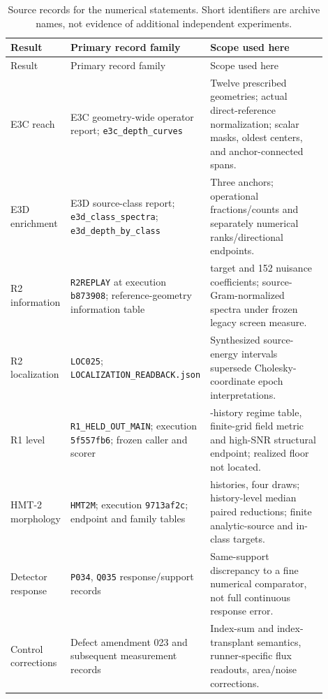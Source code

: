 \small
\begin{longtable}{>{\raggedright\arraybackslash}p{0.14\linewidth}>{\raggedright\arraybackslash}p{0.33\linewidth}>{\raggedright\arraybackslash}p{0.43\linewidth}}
\caption{Source records for the numerical statements. Short identifiers are archive names, not evidence of additional independent experiments.}\label{tab:records}\\
\toprule
Result&Primary record family&Scope used here\\
\midrule\endfirsthead
\toprule Result&Primary record family&Scope used here\\\midrule\endhead
E3C reach&E3C geometry-wide operator report; \texttt{e3c\_depth\_curves}&Twelve prescribed geometries; actual direct-reference normalization; scalar masks, oldest centers, and anchor-connected spans.\\
E3D enrichment&E3D source-class report; \texttt{e3d\_class\_spectra}; \texttt{e3d\_depth\_by\_class}&Three anchors; operational fractions/counts and separately numerical ranks/directional endpoints.\\
R2 information&\texttt{R2REPLAY} at execution \texttt{b873908}; reference-geometry information table&72 target and 152 nuisance coefficients; source-Gram-normalized spectra under frozen legacy screen measure.\\
R2 localization&\texttt{LOC025}; \texttt{LOCALIZATION\_READBACK.json}&Synthesized source-energy intervals supersede Cholesky-coordinate epoch interpretations.\\
R1 level&\texttt{R1\_HELD\_OUT\_MAIN}; execution \texttt{5f557fb6}; frozen caller and scorer&640-history regime table, finite-grid field metric and high-SNR structural endpoint; realized floor not located.\\
HMT-2 morphology&\texttt{HMT2M}; execution \texttt{9713af2c}; endpoint and family tables&60 histories, four draws; history-level median paired reductions; finite analytic-source and in-class targets.\\
Detector response&\texttt{P034}, \texttt{Q035} response/support records&Same-support discrepancy to a fine numerical comparator, not full continuous response error.\\
Control corrections&Defect amendment 023 and subsequent measurement records&Index-sum and index-transplant semantics, runner-specific flux readouts, area/noise corrections.\\
\bottomrule
\end{longtable}

\normalsize

